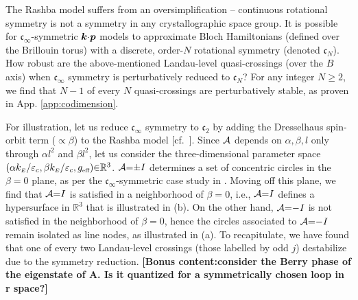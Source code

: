 \documentclass[aps, prb, showpacs, twocolumn, notitlepage, superscriptaddress]{revtex4-1}
\begin{document}
The Rashba model suffers from an oversimplification -- continuous rotational symmetry is not a symmetry in any crystallographic space group. It is possible for $\mathfrak{c}_{\infty}$-symmetric $\boldsymbol{k}{\cdot}\boldsymbol{p}$ models to approximate Bloch Hamiltonians (defined over the Brillouin torus) with a discrete, order-$N$ rotational symmetry (denoted $\mathfrak{c}_N$). How robust are the above-mentioned Landau-level quasi-crossings  (over the $B$ axis) when $\mathfrak{c}_{\infty}$ symmetry is perturbatively reduced to $\mathfrak{c}_N$? For any  integer $N{\geq}2$, we find that $N{-}1$ of every $N$ quasi-crossings  are perturbatively stable, as proven in App. \ref{app:codimension}.

For illustration, let us reduce $\mathfrak{c}_{\infty}$ symmetry to  $\mathfrak{c}_2$  by adding the Dresselhaus spin-orbit term (${\propto} \beta$) to the Rashba model [cf.\ ]. Since ${\cal A}$ depends on $\alpha,\beta,l$ only through $\alpha l^2$ and $\beta l^2$, let us consider the three-dimensional parameter space $(\alpha k_{\scriptscriptstyle{E}}/\varepsilon_c,\beta k_{\scriptscriptstyle{E}}/\varepsilon_c,g_{\scriptscriptstyle{\text{eff}}}){\in} \mathbb{R}^3$.  ${\cal A}{=}{\pm} I$ determines a set of concentric circles in the $\beta{=}0$ plane, as per the $\mathfrak{c}_{\infty}$-symmetric case study in . Moving off this plane, we find that ${\cal A}{=}I$ is satisfied in a  neighborhood of $\beta{=}0$, i.e., ${\cal A}{=}I$ defines a hypersurface in $\mathbb{R}^3$ that is illustrated in (b). On the other hand, ${\cal A}{=}{-}I$ is not satisfied in the neighborhood of $\beta{=}0$, hence the circles associated to ${\cal A}{=}{-}I$ remain isolated as line nodes, as illustrated in (a). To recapitulate, we have found that one of every two Landau-level crossings (those labelled by odd $j$) destabilize due to the symmetry reduction. \textbf{[Bonus content:consider the Berry phase of the eigenstate of A. Is it quantized for a symmetrically chosen loop in r space?]}
\end{document}
